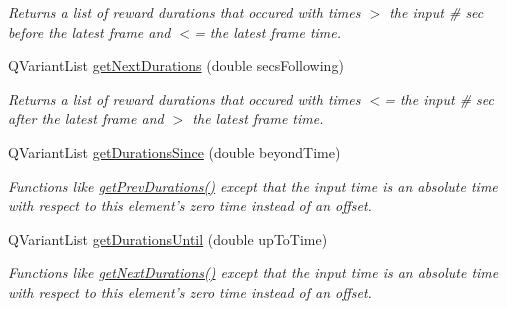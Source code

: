 \begin{DoxyCompactItemize}
\begin{DoxyCompactList}\small\item\em Returns a list of reward durations that occured with times $>$ the input \# sec before the latest frame and $<$= the latest frame time. \end{DoxyCompactList}\item 
Q\-Variant\-List \hyperlink{class_picto_1_1_analysis_reward_data_ad6f132e602ef774ad22fad42623c9128}{get\-Next\-Durations} (double secs\-Following)
\begin{DoxyCompactList}\small\item\em Returns a list of reward durations that occured with times $<$= the input \# sec after the latest frame and $>$ the latest frame time. \end{DoxyCompactList}\item 
\hypertarget{class_picto_1_1_analysis_reward_data_adb5a74b1a72640c5e6b329d303a350b8}{Q\-Variant\-List \hyperlink{class_picto_1_1_analysis_reward_data_adb5a74b1a72640c5e6b329d303a350b8}{get\-Durations\-Since} (double beyond\-Time)}\label{class_picto_1_1_analysis_reward_data_adb5a74b1a72640c5e6b329d303a350b8}

\begin{DoxyCompactList}\small\item\em Functions like \hyperlink{class_picto_1_1_analysis_reward_data_a5077cf16806502afc4f14b8bded10f1f}{get\-Prev\-Durations()} except that the input time is an absolute time with respect to this element's zero time instead of an offset. \end{DoxyCompactList}\item 
\hypertarget{class_picto_1_1_analysis_reward_data_a5155a83d65d37fffd6c629e968004de3}{Q\-Variant\-List \hyperlink{class_picto_1_1_analysis_reward_data_a5155a83d65d37fffd6c629e968004de3}{get\-Durations\-Until} (double up\-To\-Time)}\label{class_picto_1_1_analysis_reward_data_a5155a83d65d37fffd6c629e968004de3}

\begin{DoxyCompactList}\small\item\em Functions like \hyperlink{class_picto_1_1_analysis_reward_data_ad6f132e602ef774ad22fad42623c9128}{get\-Next\-Durations()} except that the input time is an absolute time with respect to this element's zero time instead of an offset. \end{DoxyCompactList}\end{DoxyCompactItemize}
